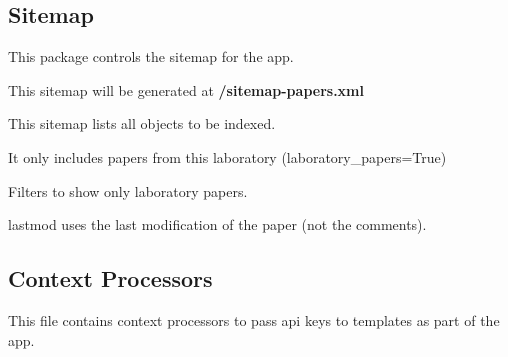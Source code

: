 \documentclass[letterpaper,10pt,english]{sphinxmanual}
\begin{document}
\subsection{Sitemap}
\label{papers:module-papers.sitemap}\label{papers:sitemap}
This package controls the sitemap for the {\hyperref[papers:module-papers]{}} app.

This sitemap will be generated at \textbf{/sitemap-papers.xml}

\begin{fulllineitems}
\label{papers:papers.sitemap.LabPublicationsSitemap}
This sitemap lists all {\hyperref[papers:papers.models.Publication]{}} objects to be indexed.

It only includes papers from this laboratory (laboratory\_papers=True)

\begin{fulllineitems}
\label{papers:papers.sitemap.LabPublicationsSitemap.items}
Filters {\hyperref[papers:papers.models.Publication]{}} to show only laboratory papers.

\end{fulllineitems}


\begin{fulllineitems}
\label{papers:papers.sitemap.LabPublicationsSitemap.lastmod}
lastmod uses the last modification of the paper (not the comments).

\end{fulllineitems}


\end{fulllineitems}



\subsection{Context Processors}
\label{papers:module-papers.context_processors}\label{papers:context-processors}
This file contains context processors to pass api keys to templates as part of the {\hyperref[papers:module-papers]{}} app.
\end{document}
